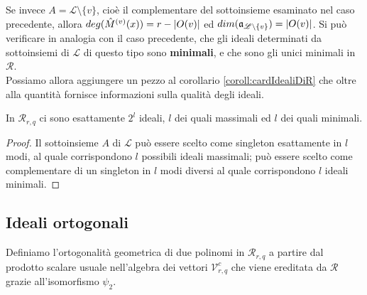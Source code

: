 Se invece $A = \mathscr{L} \setminus \lbrace v \rbrace$, cioè il complementare del sottoinsieme esaminato nel caso precedente, allora
$deg(\hat{M}^{(v)}(x) ) = r - \arrowvert O(v) \arrowvert$ ed $dim(\mathfrak{a}_{\mathscr{L} \setminus \lbrace v \rbrace}) = \arrowvert O(v) \arrowvert$. Si può verificare in analogia con il caso precedente, che gli ideali determinati da sottoinsiemi di $\mathscr{L}$ di questo tipo sono {\bf minimali}, e che sono gli unici minimali in $\mathcal{R}$.\\
Possiamo allora aggiungere un pezzo al corollario \ref{coroll:cardIdealiDiR} che oltre alla quantità fornisce informazioni sulla qualità degli ideali.

\begin{corollario}\label{cor:cardIdealiDiR}
   In $\mathcal{R}_{r,q}$ ci sono esattamente $2^{l}$ ideali, $l$ dei quali massimali ed $l$ dei quali minimali.
\end{corollario}
\begin{proof}
   Il sottoinsieme $A$ di $\mathscr{L}$ può essere scelto come singleton esattamente in $l$ modi, al quale corrispondono $l$ possibili ideali massimali; può essere scelto come complementare di un singleton in $l$ modi diversi al quale corrispondono $l$ ideali minimali.
\end{proof}


\subsection{Ideali ortogonali}

Definiamo l'ortogonalità geometrica di due polinomi in $\mathcal{R}_{r,q}$ a partire dal prodotto scalare usuale nell'algebra dei vettori $\mathcal{V}_{r, q}^{c}$ che viene ereditata da $\mathcal{R}$ grazie all'isomorfismo $\psi_{2}$.



